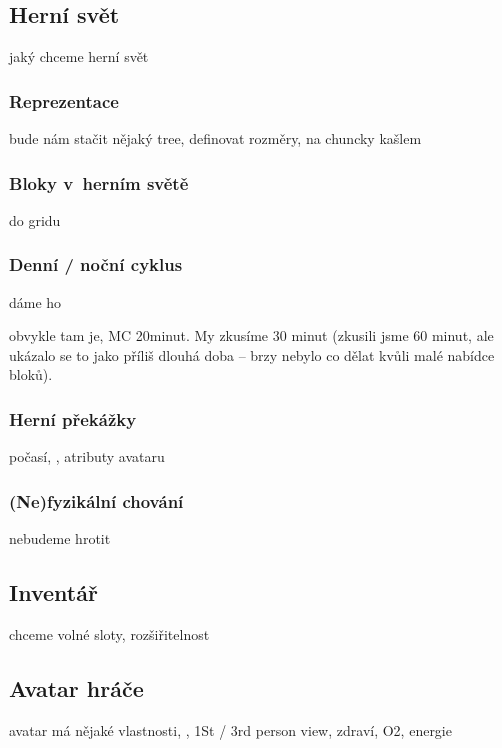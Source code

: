 \subsection{Herní svět}

jaký chceme herní svět

\subsubsection{Reprezentace}

bude nám stačit nějaký tree, definovat rozměry, na chuncky kašlem

\subsubsection{Bloky v~herním světě}

do gridu

\subsubsection{Denní / noční cyklus}
dáme ho

obvykle tam je, MC 20minut. My zkusíme 30 minut (zkusili jsme 60 minut, ale ukázalo se to jako příliš dlouhá doba -- brzy nebylo co dělat kvůli malé nabídce bloků).



\subsubsection{Herní překážky}

počasí, , atributy avataru

\subsubsection{(Ne)fyzikální chování}

nebudeme hrotit

\subsection{Inventář}

chceme volné sloty, rozšiřitelnost

\subsection{Avatar hráče}
avatar má nějaké vlastnosti, \HUD{}, 1St / 3rd person view, zdraví, O2, energie




